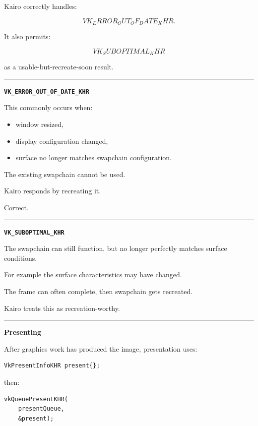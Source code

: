 Kairo correctly handles:

\[
VK_ERROR_OUT_OF_DATE_KHR.
\]

It also permits:

\[
VK_SUBOPTIMAL_KHR
\]

as a usable-but-recreate-soon result.

\begin{center}\rule{0.5\linewidth}{0.5pt}\end{center}

\textbf{\texttt{VK\_ERROR\_OUT\_OF\_DATE\_KHR}}

This commonly occurs when:

\begin{itemize}
\tightlist
\item
  window resized,
\item
  display configuration changed,
\item
  surface no longer matches swapchain configuration.
\end{itemize}

The existing swapchain cannot be used.

Kairo responds by recreating it.

Correct.

\begin{center}\rule{0.5\linewidth}{0.5pt}\end{center}

\textbf{\texttt{VK\_SUBOPTIMAL\_KHR}}

The swapchain can still function, but no longer perfectly matches surface conditions.

For example the surface characteristics may have changed.

The frame can often complete, then swapchain gets recreated.

Kairo treats this as recreation-worthy.

\begin{center}\rule{0.5\linewidth}{0.5pt}\end{center}

\textbf{Presenting}

After graphics work has produced the image, presentation uses:

\begin{verbatim}
VkPresentInfoKHR present{};
\end{verbatim}

then:

\begin{verbatim}
vkQueuePresentKHR(
    presentQueue,
    &present);
\end{verbatim}

